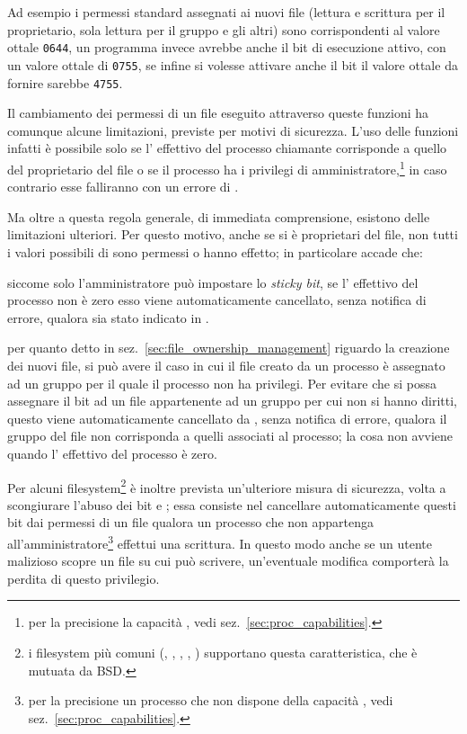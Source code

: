 Ad esempio i permessi standard assegnati ai nuovi file (lettura e scrittura
per il proprietario, sola lettura per il gruppo e gli altri) sono
corrispondenti al valore ottale \texttt{0644}, un programma invece avrebbe
anche il bit di esecuzione attivo, con un valore ottale di \texttt{0755}, se
infine si volesse attivare anche il bit  il valore ottale da fornire
sarebbe \texttt{4755}.

Il cambiamento dei permessi di un file eseguito attraverso queste funzioni ha
comunque alcune limitazioni, previste per motivi di sicurezza. L'uso delle
funzioni infatti è possibile solo se l' effettivo del processo
chiamante corrisponde a quello del proprietario del file o se il processo ha i
privilegi di amministratore,\footnote{per la precisione la capacità
  , vedi sez.~\ref{sec:proc_capabilities}.} in caso
contrario esse falliranno con un errore di .

Ma oltre a questa regola generale, di immediata comprensione, esistono delle
limitazioni ulteriori. Per questo motivo, anche se si è proprietari del file,
non tutti i valori possibili di  sono permessi o hanno effetto;
in particolare accade che:
\begin{enumerate*}
\item siccome solo l'amministratore può impostare lo \textit{sticky bit}, se
  l' effettivo del processo non è zero esso viene automaticamente
  cancellato, senza notifica di errore, qualora sia stato indicato
  in .
\item per quanto detto in sez.~\ref{sec:file_ownership_management} riguardo la
  creazione dei nuovi file, si può avere il caso in cui il file creato da un
  processo è assegnato ad un gruppo per il quale il processo non ha privilegi.
  Per evitare che si possa assegnare il bit  ad un file appartenente
  ad un gruppo per cui non si hanno diritti, questo viene automaticamente
  cancellato da , senza notifica di errore, qualora il gruppo del
  file non corrisponda a quelli associati al processo; la cosa non avviene
  quando l' effettivo del processo è zero.
\end{enumerate*}

Per alcuni filesystem\footnote{i filesystem più comuni (,
  , , , ) supportano
  questa caratteristica, che è mutuata da BSD.} è inoltre prevista
un'ulteriore misura di sicurezza, volta a scongiurare l'abuso dei bit
 e ; essa consiste nel cancellare automaticamente questi
bit dai permessi di un file qualora un processo che non appartenga
all'amministratore\footnote{per la precisione un processo che non dispone
  della capacità , vedi sez.~\ref{sec:proc_capabilities}.}
effettui una scrittura. In questo modo anche se un utente malizioso scopre un
file  su cui può scrivere, un'eventuale modifica comporterà la
perdita di questo privilegio.

